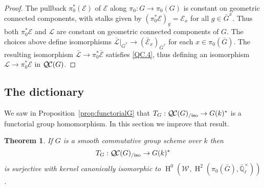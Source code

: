 \documentclass{amsart}
\theoremstyle{plain}
\newtheorem{theorem}{Theorem}[section]
\theoremstyle{definition}
\theoremstyle{remark}
\newcommand{\EE}{\mathbb{\bar Q}_\ell}
\newcommand{\Fq}{k}
\newcommand{\EEx}{\EE^\times}
\newcommand{\Weil}[1]{\mathcal{W}_{#1}}
\DeclareMathOperator{\Hh}{H}
\newcommand{\TrFrob}[1]{T_{#1}}
\newcommand{\qcs}[1]{{\mathcal{#1}}}
\newcommand{\gqcs}[1]{{\mathcal{\bar #1}}}
\newcommand{\QC}{{\mathcal{Q\hskip-0.8pt C}}}
\newcommand{\QCiso}[1]{\QC(#1)_{/\text{iso}}}
\newcommand{\bG}{\bar{G}}
\begin{document}
\begin{proof}
The pullback $\pi_0^*(\qcs{E})$ of $\qcs{E}$ along $\pi_0 : G \to \pi_0(G)$ is constant
on geometric connected components, with stalks given by
$(\pi_0^* \qcs{E})_g = \qcs{E}_{x}$ for all $g\in \bG^x$.  Thus both $\pi_0^*\qcs{E}$ and $\qcs{L}$
are constant on geometric connected components of $G$.
The choices above define isomorphisms
$\gqcs{L}\vert_{\bG^x} \to  (\gqcs{E}_{x})_{\bG^x}$ for each $x\in \pi_0(\bG)$.
The resulting isomorphism $\gqcs{L} \to \pi_0^* \gqcs{E}$ satisfies \ref{QC.4},
thus defining an isomorphism $\qcs{L} \to \pi_0^* \qcs{E}$ in $\QC(G)$.
\end{proof}

\subsection{The dictionary}
\label{sec:snake}

We saw in Proposition~\ref{prop:functorialG} that $\TrFrob{G} : \QCiso{G} \to G(\Fq)^*$ is a functorial group homomorphism.
In this section we improve that result.

\begin{theorem}\label{thm:snake}
  If $G$ is a smooth commutative group scheme over $\Fq$ then
  \[
  \TrFrob{G} : \QCiso{G} \to G(\Fq)^*
  \]
is surjective with kernel canonically isomorphic to $\Hh^0(\Weil{},\Hh^2(\pi_0({\bar G}),\EEx))$.
\end{theorem}
\end{document}
